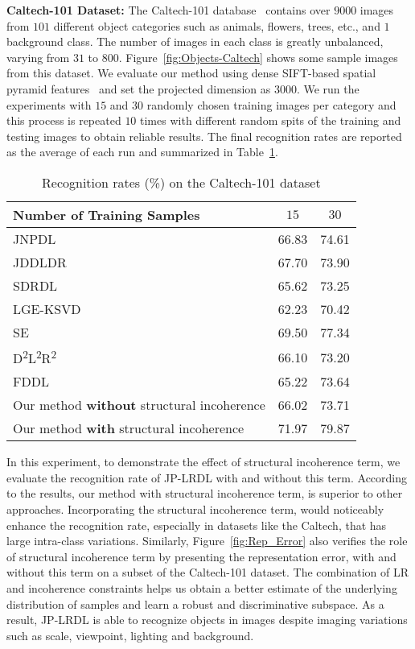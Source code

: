 \documentclass[journal]{IEEEtran}
\newcommand\Tstrut{\rule{0pt}{2.6ex}}         %
\newcommand\Bstrut{\rule[-0.9ex]{0pt}{0pt}}   %
\begin{document}
\vspace{1em}
\textbf{Caltech-101 Dataset:} The Caltech-101 database~\cite{Caltech} contains over $9000$ images from $101$ different object categories such as animals, flowers, trees, etc., and $1$ background class. The number of images in each class is greatly unbalanced, varying from $31$ to $800$. Figure~\ref{fig:Objects-Caltech} shows some sample images from this dataset. We evaluate our method using dense SIFT-based spatial pyramid features~\cite{LC-KSVD} and set the projected dimension as $3000$. We run the experiments with $15$ and $30$ randomly chosen training images per category and this process is repeated $10$ times with different random spits of the training and testing images to obtain reliable results. The final recognition rates are reported as the average of each run and summarized in Table~\ref{table:Caltech}.
\begin{table}[b]
\caption{Recognition rates (\%) on the Caltech-101 dataset}
\label{table:Caltech}
\centering
\begin{tabular}{|l|c|c|}
\hline
Number of Training Samples & $15$ & $30$ \Tstrut\Bstrut\\
\hline \hline 
JNPDL~\cite{JNPDL}       & 66.83 & 74.61 \Tstrut\Bstrut\\
JDDLDR~\cite{JDDRDL}     & 67.70 & 73.90 \Tstrut\Bstrut\\
SDRDL~\cite{Simul-DL}    & 65.62 & 73.25 \Tstrut\Bstrut\\
LGE-KSVD~\cite{LGE-KSVD} & 62.23 & 70.42 \Tstrut\Bstrut\\
SE~\cite{SE}             & 69.50 & 77.34 \Tstrut\Bstrut\\
D\textsuperscript{2}L\textsuperscript{2}R\textsuperscript{2}~\cite{D2L2R2} & 66.10 & 73.20 \Tstrut\Bstrut\\
FDDL~\cite{FDDL}         & 65.22 & 73.64 \Tstrut\Bstrut\\
Our method \textbf{without} structural incoherence & 66.02 & 73.71 \Tstrut\Bstrut\\
Our method \textbf{with} structural incoherence    & 71.97 & 79.87 \Tstrut\Bstrut\\
\hline
\end{tabular}
\end{table}

In this experiment, to demonstrate the effect of structural incoherence term, we evaluate the recognition rate of JP-LRDL with and without this term. According to the results, our method with structural incoherence term, is superior to other approaches. Incorporating the structural incoherence term, would noticeably enhance the recognition rate, especially in datasets like the Caltech, that has large intra-class variations. Similarly, Figure~\ref{fig:Rep_Error} also verifies the role of structural incoherence term by presenting the representation error, with and without this term on a subset of the Caltech-101 dataset. The combination of LR and incoherence constraints helps us obtain a better estimate of the underlying distribution of samples and learn a robust and discriminative subspace. As a result, JP-LRDL is able to recognize objects in images despite imaging variations such as scale, viewpoint, lighting and background. 
\end{document}
